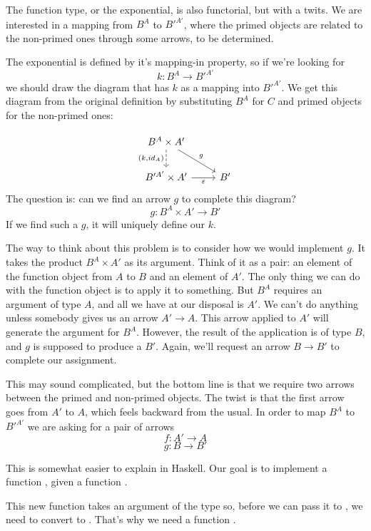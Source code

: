 \documentclass[DaoFP]{subfiles}
\begin{document}
The function type, or the exponential, is also functorial, but with a twits. We are interested in a mapping from $B^A$ to $B'^{A'}$, where the primed objects are related to the non-primed ones through some arrows, to be determined. 

The exponential is defined by it's mapping-in property, so if we're looking for
\[k \colon B^A \to B'^{A'} \]
we should draw the diagram that has $k$ as a mapping into $B'^{A'}$. We get this diagram from the original definition by substituting $B^A$ for $C$ and primed objects for the non-primed ones:

\[
 \begin{tikzcd}
 B^A \times A'
 \arrow[d, dashed, "{(k, id_A)}"']
 \arrow[rd, "g"]
 \\
 B'^{A'} \times A'
 \arrow[r, "\varepsilon"']
& B'
 \end{tikzcd}
\]
The question is: can we find an arrow $g$ to complete this diagram? 
\[g \colon B^A \times A' \to B'\]
If we find such a $g$, it will uniquely define our $k$.

The way to think about this problem is to consider how we would implement $g$. It takes the product $B^A \times A'$ as its argument. Think of it as a pair: an element of the function object from $A$ to $B$ and an element of $A'$. The only thing we can do with the function object is to apply it to something. But $B^A$ requires an argument of type $A$, and all we have at our disposal is $A'$. We can't do anything unless somebody gives us an arrow $A' \to A$. This arrow applied to $A'$ will generate the argument for $B^A$. However, the result of the application is of type $B$, and $g$ is supposed to produce a $B'$. Again, we'll request an arrow $B \to B'$ to complete our assignment. 

This may sound complicated, but the bottom line is that we require two arrows between the primed and non-primed objects. The twist is that the first arrow goes from $A'$ to $A$, which feels backward from the usual. In order to map $B^A$ to $B'^{A'}$ we are asking for a pair of arrows
\[f \colon A' \to A\]
\[g \colon B \to B' \]

This is somewhat easier to explain in Haskell. Our goal is to implement a function , given a function . 

This new function takes an argument of the type  so, before we can pass it to , we need to convert  to . That's why we need a function . 
\end{document}
